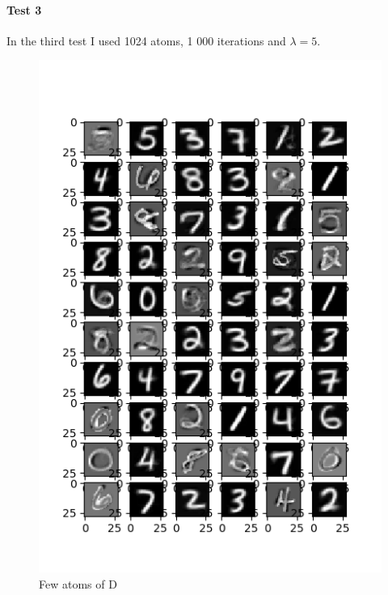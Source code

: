 \documentclass[a4paper,10pt]{article}
\begin{document}
\paragraph{Test 3} In the third test I used 1024 atoms, 1 000 iterations and $\lambda = 5$.
\begin{figure}[h]
 \centering
 \includegraphics[scale=0.82]{Results/SPAMS_X_ALL_K1024/D_lambdagrand.png}
 \caption{Few atoms of D}
\end{figure}
\end{document}
